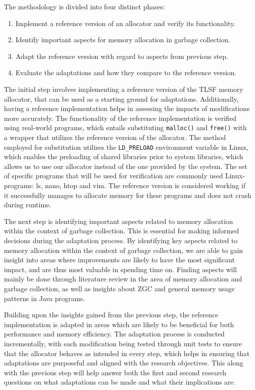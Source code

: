 
The methodology is divided into four distinct phases:

\begin{enumerate}
    \item Implement a reference version of an allocator and verify its functionality.
    \item Identify important aspects for memory allocation in garbage collection.
    \item Adapt the reference version with regard to aspects from previous step.
    \item Evaluate the adaptations and how they compare to the reference version.
\end{enumerate}

The initial step involves implementing a reference version of the TLSF memory allocator, that can be used as a starting ground for adaptations. Additionally, having a reference implementation helps in assessing the impacts of modifications more accurately. The functionality of the reference implementation is verified using real-world programs, which entails substituting \texttt{malloc()} and \texttt{free()} with a wrapper that utilizes the reference version of the allocator. The method employed for substitution utilizes the \texttt{LD\_PRELOAD} environment variable in Linux, which enables the preloading of shared libraries prior to system libraries, which allows us to use our allocator instead of the one provided by the system. The set of specific programs that will be used for verification are commonly used Linux-programs: ls, nano, htop and vim. The reference version is considered working if it successfully manages to allocate memory for these programs and does not crash during runtime. 

The next step is identifying important aspects related to memory allocation within the context of garbage collection. This is essential for making informed decisions during the adaptation process. By identifying key aspects related to memory allocation within the context of garbage collection, we are able to gain insight into areas where improvements are likely to have the most significant impact, and are thus most valuable in spending time on. Finding aspects will mainly be done through literature review in the area of memory allocation and garbage collection, as well as insights about ZGC and general memory usage patterns in Java programs.

Building upon the insights gained from the previous step, the reference implementation is adapted in areas which are likely to be beneficial for both performance and memory efficiency. The adaptation process is conducted incrementally, with each modification being tested through unit tests to ensure that the allocator behaves as intended in every step, which helps in ensuring that adaptations are purposeful and aligned with the research objectives. This along with the previous step will help answer both the first and second research questions on what adaptations can be made and what their implications are.


